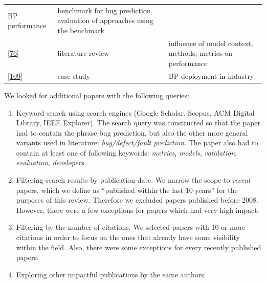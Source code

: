 \documentclass[]{book}
\begin{document}
\begin{longtable}[]{@{}lll@{}}
\begin{minipage}[t]{0.18\columnwidth}
BP performance\strut
\end{minipage} & \begin{minipage}[t]{0.50\columnwidth}\raggedright\strut
benchmark for bug prediction, evaluation of approaches using the
benchmark\strut
\end{minipage}\tabularnewline
\begin{minipage}[t]{0.23\columnwidth}\raggedright\strut
{[}\protect\hyperlink{ref-Hall2012}{76}{]}\strut
\end{minipage} & \begin{minipage}[t]{0.18\columnwidth}\raggedright\strut
literature review\strut
\end{minipage} & \begin{minipage}[t]{0.50\columnwidth}\raggedright\strut
influence of model context, methods, metrics on performance\strut
\end{minipage}\tabularnewline
\begin{minipage}[t]{0.23\columnwidth}\raggedright\strut
{[}\protect\hyperlink{ref-Lewis2013}{109}{]}\strut
\end{minipage} & \begin{minipage}[t]{0.18\columnwidth}\raggedright\strut
case study\strut
\end{minipage} & \begin{minipage}[t]{0.50\columnwidth}\raggedright\strut
BP deployment in industry\strut
\end{minipage}\tabularnewline
\bottomrule
\end{longtable}

We looked for additional papers with the following queries:

\begin{enumerate}
\def\labelenumi{\arabic{enumi}.}
\item
  Keyword search using search engines (Google Scholar, Scopus, ACM
  Digital Library, IEEE Explorer). The search query was constructed so
  that the paper had to contain the phrase bug prediction, but also the
  other more general variants used in literature: \emph{bug/defect/fault
  prediction}. The paper also had to contain at least one of following
  keywords: \emph{metrics}, \emph{models}, \emph{validation},
  \emph{evaluation}, \emph{developers}.
\item
  Filtering search results by publication date. We narrow the scope to
  \emph{recent} papers, which we define as ``published within the last
  10 years'' for the purposes of this review. Therefore we excluded
  papers published before 2008. However, there were a few exceptions for
  papers which had very high impact.
\item
  Filtering by the number of citations. We selected papers with 10 or
  more citations in order to focus on the ones that already have some
  visibility within the field. Also, there were some exceptions for
  every recently published papers.
\item
  Exploring other impactful publications by the same authors.
\end{enumerate}
\end{document}
